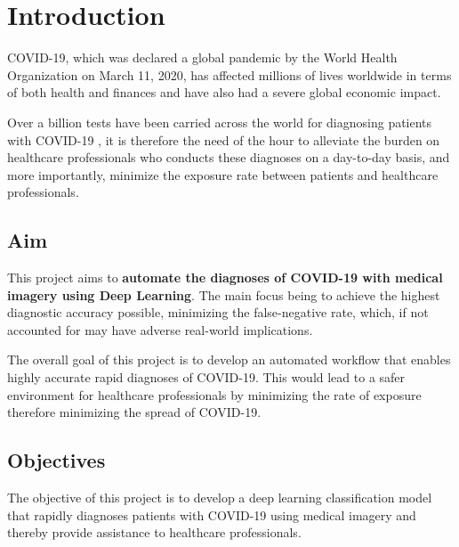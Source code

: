 
\chapter{Introduction} %

\label{ChapterX} %


COVID-19, which was declared a global pandemic by the World Health Organization on March 11, 2020, has affected
millions of lives worldwide in terms of both health and finances and have also had 
a severe global economic impact.

Over a billion tests have been carried across the world for diagnosing patients with COVID-19 \cite{STA21}, 
it is therefore the need of the hour to alleviate the burden on healthcare professionals who conducts these diagnoses on a day-to-day basis, 
and more importantly, minimize the exposure rate between patients and healthcare professionals.
\section{Aim}

This project aims to \textbf{automate the diagnoses of COVID-19 with medical imagery using Deep Learning}. The main focus being
to achieve the highest diagnostic accuracy possible, minimizing the false-negative rate, which, if not accounted for may have adverse real-world implications. 

The overall goal of this project is to develop an automated workflow that enables highly accurate rapid 
diagnoses of COVID-19. This would lead to a safer environment 
for healthcare professionals by minimizing the rate of exposure 
therefore minimizing the spread of COVID-19.

\section{Objectives}

The objective of this project is to develop a deep learning classification model 
that rapidly diagnoses patients with COVID-19 using medical imagery and thereby provide assistance to healthcare professionals.

